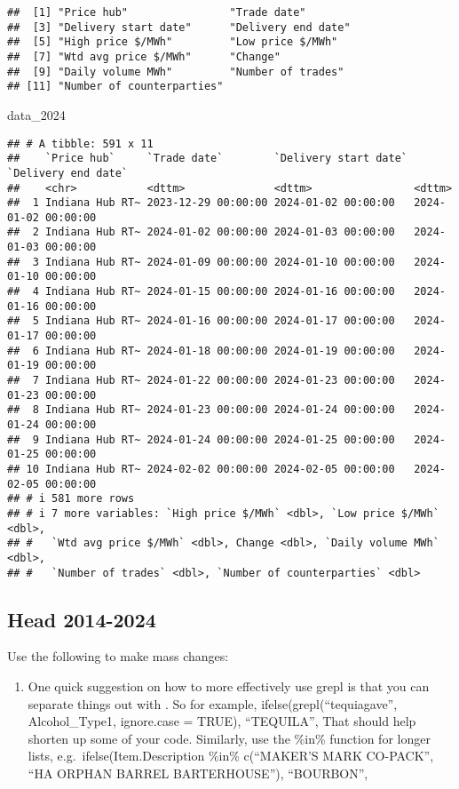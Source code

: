 \documentclass[
]{article}
\newenvironment{Shaded}{\begin{snugshade}}{\end{snugshade}}
\newcommand{\NormalTok}[1]{#1}
\providecommand{\tightlist}{%
  \setlength{\itemsep}{0pt}\setlength{\parskip}{0pt}}
\begin{document}
\begin{verbatim}
##  [1] "Price hub"                "Trade date"              
##  [3] "Delivery start date"      "Delivery end date"       
##  [5] "High price $/MWh"         "Low price $/MWh"         
##  [7] "Wtd avg price $/MWh"      "Change"                  
##  [9] "Daily volume MWh"         "Number of trades"        
## [11] "Number of counterparties"
\end{verbatim}

\begin{Shaded}
\begin{Highlighting}[]
\NormalTok{data\_2024}
\end{Highlighting}
\end{Shaded}

\begin{verbatim}
## # A tibble: 591 x 11
##    `Price hub`     `Trade date`        `Delivery start date` `Delivery end date`
##    <chr>           <dttm>              <dttm>                <dttm>             
##  1 Indiana Hub RT~ 2023-12-29 00:00:00 2024-01-02 00:00:00   2024-01-02 00:00:00
##  2 Indiana Hub RT~ 2024-01-02 00:00:00 2024-01-03 00:00:00   2024-01-03 00:00:00
##  3 Indiana Hub RT~ 2024-01-09 00:00:00 2024-01-10 00:00:00   2024-01-10 00:00:00
##  4 Indiana Hub RT~ 2024-01-15 00:00:00 2024-01-16 00:00:00   2024-01-16 00:00:00
##  5 Indiana Hub RT~ 2024-01-16 00:00:00 2024-01-17 00:00:00   2024-01-17 00:00:00
##  6 Indiana Hub RT~ 2024-01-18 00:00:00 2024-01-19 00:00:00   2024-01-19 00:00:00
##  7 Indiana Hub RT~ 2024-01-22 00:00:00 2024-01-23 00:00:00   2024-01-23 00:00:00
##  8 Indiana Hub RT~ 2024-01-23 00:00:00 2024-01-24 00:00:00   2024-01-24 00:00:00
##  9 Indiana Hub RT~ 2024-01-24 00:00:00 2024-01-25 00:00:00   2024-01-25 00:00:00
## 10 Indiana Hub RT~ 2024-02-02 00:00:00 2024-02-05 00:00:00   2024-02-05 00:00:00
## # i 581 more rows
## # i 7 more variables: `High price $/MWh` <dbl>, `Low price $/MWh` <dbl>,
## #   `Wtd avg price $/MWh` <dbl>, Change <dbl>, `Daily volume MWh` <dbl>,
## #   `Number of trades` <dbl>, `Number of counterparties` <dbl>
\end{verbatim}

\subsection{Head 2014-2024}\label{head-2014-2024}

Use the following to make mass changes:

\begin{enumerate}
\def\labelenumi{\arabic{enumi}.}
\tightlist
\item
  One quick suggestion on how to more effectively use grepl is that you
  can separate things out with \textbar. So for example,
  ifelse(grepl(``tequi\textbar agave'', Alcohol\_Type1, ignore.case =
  TRUE), ``TEQUILA'', That should help shorten up some of your code.
  Similarly, use the \%in\% function for longer lists,
  e.g.~ifelse(Item.Description \%in\% c(``MAKER'S MARK CO-PACK'', ``HA
  ORPHAN BARREL BARTERHOUSE''), ``BOURBON'',
\end{enumerate}
\end{document}

